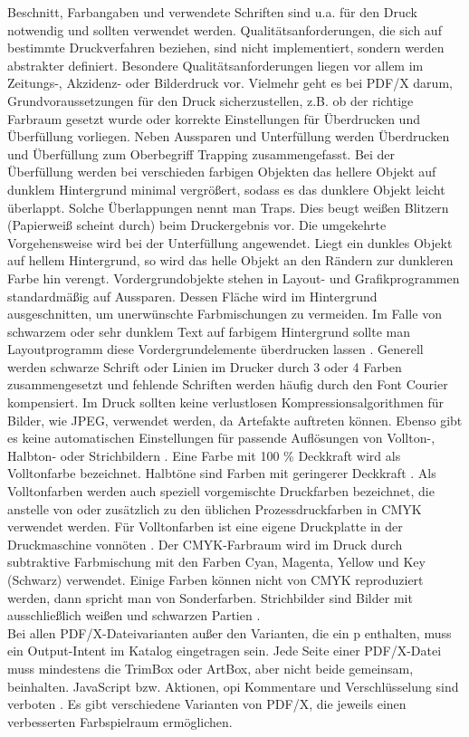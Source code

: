 Beschnitt, Farbangaben und verwendete Schriften sind u.a. für den Druck notwendig und sollten verwendet werden. Qualitätsanforderungen, die sich auf bestimmte Druckverfahren beziehen, sind nicht implementiert, sondern werden abstrakter definiert. Besondere Qualitätsanforderungen liegen vor allem im Zeitungs-, Akzidenz- oder Bilderdruck vor. Vielmehr geht es bei PDF/X darum, Grundvoraussetzungen für den Druck sicherzustellen, z.B. ob der richtige Farbraum gesetzt wurde oder korrekte Einstellungen für Überdrucken und Überfüllung vorliegen. Neben Aussparen und Unterfüllung werden Überdrucken und Überfüllung zum Oberbegriff Trapping zusammengefasst. Bei der Überfüllung werden bei verschieden farbigen Objekten das hellere Objekt auf dunklem Hintergrund minimal vergrößert, sodass es das dunklere Objekt leicht überlappt. Solche Überlappungen nennt man Traps. Dies beugt weißen Blitzern (Papierweiß scheint durch) beim Druckergebnis vor. Die umgekehrte Vorgehensweise wird bei der Unterfüllung angewendet. Liegt ein dunkles Objekt auf hellem Hintergrund, so wird das helle Objekt an den Rändern zur dunkleren Farbe hin verengt. Vordergrundobjekte stehen in Layout- und Grafikprogrammen standardmäßig auf Aussparen. Dessen Fläche wird im Hintergrund ausgeschnitten, um unerwünschte Farbmischungen zu vermeiden. Im Falle von schwarzem oder sehr dunklem Text auf farbigem Hintergrund sollte man Layoutprogramm diese Vordergrundelemente überdrucken lassen \cite{kompendium}. Generell werden schwarze Schrift oder Linien im Drucker durch 3 oder 4 Farben zusammengesetzt und fehlende Schriften werden häufig durch den Font Courier kompensiert. Im Druck sollten keine verlustlosen Kompressionsalgorithmen für Bilder, wie JPEG, verwendet werden, da Artefakte auftreten können. Ebenso gibt es keine automatischen Einstellungen für passende Auflösungen von Vollton-, Halbton- oder Strichbildern \cite{adobe-pdf-x}. Eine Farbe mit 100 \% Deckkraft wird als Volltonfarbe bezeichnet. Halbtöne sind Farben mit geringerer Deckkraft \cite{halb-voll}. Als Volltonfarben werden auch speziell vorgemischte Druckfarben bezeichnet, die anstelle von oder zusätzlich zu den üblichen Prozessdruckfarben in CMYK verwendet werden. Für Volltonfarben ist eine eigene Druckplatte in der Druckmaschine vonnöten \cite{adobe-voll}. Der CMYK-Farbraum wird im Druck durch subtraktive Farbmischung mit den Farben Cyan, Magenta, Yellow und Key (Schwarz) verwendet. Einige Farben können nicht von CMYK reproduziert werden, dann spricht man von Sonderfarben. Strichbilder sind Bilder mit ausschließlich weißen und schwarzen Partien \cite{strich}. \\
Bei allen PDF/X-Dateivarianten außer den Varianten, die ein p enthalten, muss ein Output-Intent im Katalog eingetragen sein. Jede Seite einer PDF/X-Datei muss mindestens die TrimBox oder ArtBox, aber nicht beide gemeinsam, beinhalten. JavaScript bzw. Aktionen, \gls{opi} Kommentare und Verschlüsselung sind verboten \cite{schneeberger}. Es gibt verschiedene Varianten von PDF/X, die jeweils einen verbesserten Farbspielraum ermöglichen. 

